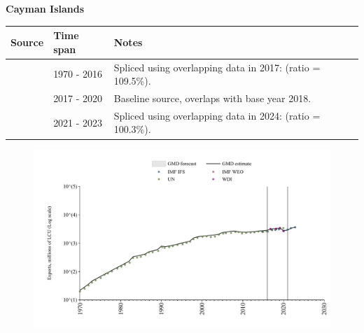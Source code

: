 \documentclass[12pt,a4paper,landscape]{article}
\begin{document}
\begin{adjustbox}{max totalsize={\paperwidth}{\paperheight},center}
\begin{minipage}[t][\textheight][t]{\textwidth}
\vspace*{0.5cm}
{}
\begin{center}
{\Large\bfseries Cayman Islands}
\end{center}
\vspace{0.5cm}
\begin{table}[H]
\centering
\small
\begin{tabular}{|l|l|l|}
\hline
\textbf{Source} & \textbf{Time span} & \textbf{Notes} \\
\hline
\rowcolor{white}\cite{UN}& 1970 - 2016 &Spliced using overlapping data in 2017: (ratio = 109.5\%).\\
\rowcolor{lightgray}\cite{WDI}& 2017 - 2020 &Baseline source, overlaps with base year 2018.\\
\rowcolor{white}\cite{IMF_IFS}& 2021 - 2023 &Spliced using overlapping data in 2024: (ratio = 100.3\%).\\
\hline
\end{tabular}
\end{table}
\begin{figure}[H]
\centering
\includegraphics[width=\textwidth,height=0.6\textheight,keepaspectratio]{graphs/CYM_exports.pdf}
\end{figure}
\end{minipage}
\end{adjustbox}
\end{document}
